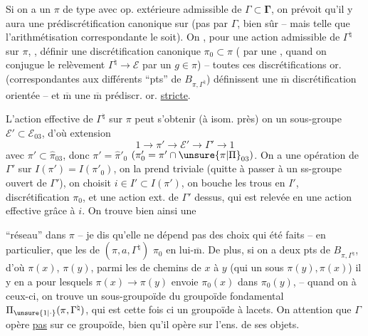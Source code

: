 
Si on a un $\pi$  de type  avec op. extérieure admissible de $\Gamma\subset\boldsymbol{\Gamma}$, on prévoit qu'il y aura une prédiscrétification  canonique sur  (pas  par $\Gamma$, bien sûr \unsure{!|)} -- mais telle que l'arithmétisation correspondante le soit). On  , pour une action  admissible de $\Gamma^{\natural}$ sur $\pi$, , définir une discrétification   canonique $\pi_0\subset\pi$ ( par une , quand on conjugue  le relèvement $\Gamma^{\natural}\to\mathcal E$ par un $g\in\pi$) -- toutes ces discrétifications or. (correspondantes aux différents ``pts'' de $B_{\pi,\Gamma^{\natural}}$) définissent une $\overline{\mathrm m}$ discrétification orientée -- et $\overline{\mathrm m}$ une $\overline{\mathrm m}$ prédiscr. or. \uline{stricte}.

L'action effective de $\Gamma^{\natural}$ sur $\pi$ peut s'obtenir (à isom. près)  on  un sous-groupe  $\mathcal E'\subset\mathcal E_{03}$, d'où extension
\[
1\to\pi'\to\mathcal E'\to\Gamma'\to1
\]
avec $\pi'\subset\widehat{\pi}_{03}$, donc $\pi'=\widehat{\pi}'_0$ $(\pi'_0=\pi'\cap\unsure{\pi|\Pi}_{03})$. On a une opération de $\Gamma'$ sur $I(\pi')=I(\pi'_0)$, on la prend triviale (quitte à passer à un ss-groupe ouvert de $\Gamma'$), on choisit $i\in I'\subset I(\pi')$, on bouche les trous en $I'$,   discrétification  $\pi_0$, et une action ext. de $\Gamma'$ dessus, qui est relevée en une action effective grâce à $i$. On trouve bien ainsi une


``réseau''  dans $\pi$ -- je dis qu'elle ne dépend pas des choix qui  été faits -- en particulier, que les  de $(\pi,a,\Gamma^{\natural})$  $\pi_0$ en lui-$\overline{\mathrm m}$. De plus, si on a deux pts  de $B_{\pi,\Gamma^{\natural}}$, d'où $\pi(x)$, $\pi(y)$, parmi les  de chemins de $x$ à $y$ (qui  un  sous $\pi(y),\pi(x)$) il y en a pour lesquels  $\pi(x)\to\pi(y)$ envoie $\pi_0(x)$ dans $\pi_0(y)$, -- quand on   à ceux-ci, on trouve un sous-groupoïde du groupoïde fondamental $\Pi_{\unsure{1|\cdot}}(\pi,\Gamma^{\natural})$, qui est cette fois ci un groupoïde \uline{} à lacets. On  attention que $\Gamma$ opère \uline{pas} sur ce groupoïde, bien qu'il opère sur l'ens. de ses objets.

